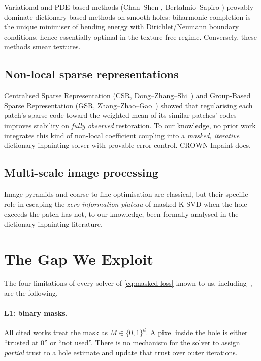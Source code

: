 \documentclass[11pt,a4paper]{article}
\theoremstyle{definition}
\theoremstyle{remark}
\begin{document}
Variational and PDE-based methods (Chan--Shen
\cite{chan2002mathematical}, Bertalmio--Sapiro
\cite{bertalmio2000image}) provably dominate dictionary-based methods
on smooth holes: biharmonic completion is the unique minimiser of
bending energy with Dirichlet/Neumann boundary conditions, hence
essentially optimal in the texture-free regime. Conversely, these
methods smear textures.

\subsection{Non-local sparse representations}

Centralised Sparse Representation (CSR,
Dong--Zhang--Shi~\cite{dong2011centralized}) and Group-Based Sparse
Representation (GSR,
Zhang--Zhao--Gao~\cite{zhang2014groupbased}) showed that regularising
each patch's sparse code toward the weighted mean of its similar
patches' codes improves stability on \emph{fully observed}
restoration. To our knowledge, no prior work integrates this kind of
non-local coefficient coupling into a \emph{masked, iterative}
dictionary-inpainting solver with provable error control. CROWN-Inpaint
does.

\subsection{Multi-scale image processing}

Image pyramids and coarse-to-fine optimisation are classical, but their
specific role in escaping the \emph{zero-information plateau} of
masked K-SVD when the hole exceeds the patch has not, to our
knowledge, been formally analysed in the dictionary-inpainting
literature.

\section{The Gap We Exploit}
\label{sec:gap}

The four limitations of every solver of \eqref{eq:masked-loss} known
to us, including~\cite{mairal2008sparse,naumova2018itkrmm,tiefenthaler2018thesis},
are the following.

\paragraph{L1: binary masks.}
All cited works treat the mask as $M\in\{0,1\}^d$. A pixel inside the
hole is either ``trusted at $0$'' or ``not used''. There is no
mechanism for the solver to assign \emph{partial} trust to a hole
estimate and update that trust over outer iterations.
\end{document}
